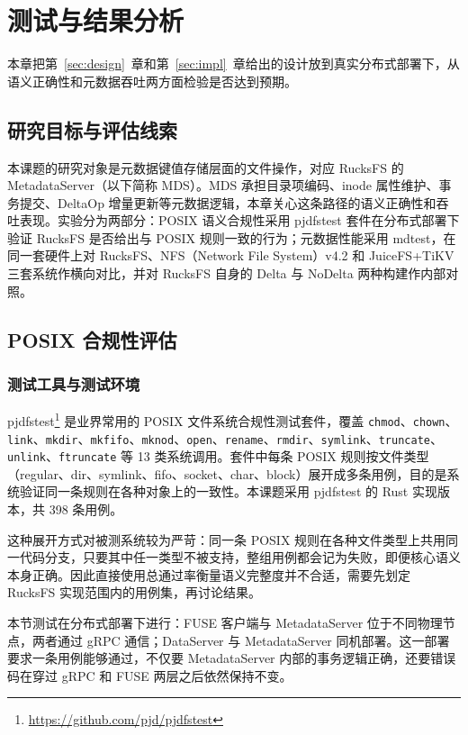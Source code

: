 \section{测试与结果分析}
\label{sec:experiments}

本章把第~\ref{sec:design}~章和第~\ref{sec:impl}~章给出的设计放到真实分布式部署下，从语义正确性和元数据吞吐两方面检验是否达到预期。

\subsection{研究目标与评估线索}
\label{sec:experiments-scope}

本课题的研究对象是元数据键值存储层面的文件操作，对应 RucksFS 的 MetadataServer（以下简称 MDS）。MDS 承担目录项编码、inode 属性维护、事务提交、DeltaOp 增量更新等元数据逻辑，本章关心这条路径的语义正确性和吞吐表现。实验分为两部分：POSIX 语义合规性采用 pjdfstest 套件在分布式部署下验证 RucksFS 是否给出与 POSIX 规则一致的行为；元数据性能采用 mdtest，在同一套硬件上对 RucksFS、NFS（Network File System）v4.2 和 JuiceFS+TiKV 三套系统作横向对比，并对 RucksFS 自身的 Delta 与 NoDelta 两种构建作内部对照。

\subsection{POSIX 合规性评估}
\label{sec:pjdfstest}

\subsubsection{测试工具与测试环境}

pjdfstest\footnote{\url{https://github.com/pjd/pjdfstest}} 是业界常用的 POSIX 文件系统合规性测试套件，覆盖 \texttt{chmod}、\texttt{chown}、\texttt{link}、\texttt{mkdir}、\texttt{mkfifo}、\texttt{mknod}、\texttt{open}、\texttt{rename}、\texttt{rmdir}、\texttt{symlink}、\texttt{truncate}、\texttt{unlink}、\texttt{ftruncate} 等 13 类系统调用。套件中每条 POSIX 规则按文件类型（regular、dir、symlink、fifo、socket、char、block）展开成多条用例，目的是系统验证同一条规则在各种对象上的一致性。本课题采用 pjdfstest 的 Rust 实现版本，共 398 条用例。

这种展开方式对被测系统较为严苛：同一条 POSIX 规则在各种文件类型上共用同一代码分支，只要其中任一类型不被支持，整组用例都会记为失败，即便核心语义本身正确。因此直接使用总通过率衡量语义完整度并不合适，需要先划定 RucksFS 实现范围内的用例集，再讨论结果。

本节测试在分布式部署下进行：FUSE 客户端与 MetadataServer 位于不同物理节点，两者通过 gRPC 通信；DataServer 与 MetadataServer 同机部署。这一部署要求一条用例能够通过，不仅要 MetadataServer 内部的事务逻辑正确，还要错误码在穿过 gRPC 和 FUSE 两层之后依然保持不变。

